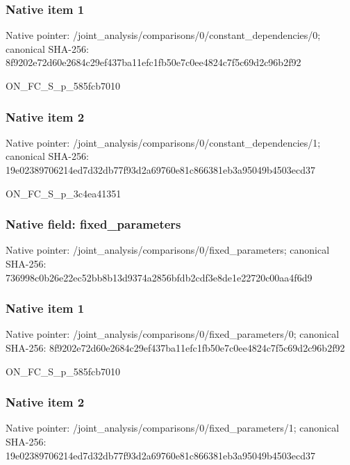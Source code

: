 \documentclass[10pt,a4paper]{article}
\begin{document}
\subsubsection{Native item 1}
Native pointer: /joint\_\allowbreak{}analysis/comparisons/0/constant\_\allowbreak{}dependencies/0; canonical SHA-256: 8f9202e72d60e2684c29ef437ba11efc1fb50e7c0ee4824c7f5c69d2c96b2f92

\begingroup\raggedright\sloppy ON\_\allowbreak{}FC\_\allowbreak{}S\_\allowbreak{}p\_\allowbreak{}585fcb7010\par\endgroup

\subsubsection{Native item 2}
Native pointer: /joint\_\allowbreak{}analysis/comparisons/0/constant\_\allowbreak{}dependencies/1; canonical SHA-256: 19e02389706214ed7d32db77f93d2a69760e81c866381eb3a95049b4503ecd37

\begingroup\raggedright\sloppy ON\_\allowbreak{}FC\_\allowbreak{}S\_\allowbreak{}p\_\allowbreak{}3c4ea41351\par\endgroup

\subsubsection{Native field: fixed\_\allowbreak{}parameters}
Native pointer: /joint\_\allowbreak{}analysis/comparisons/0/fixed\_\allowbreak{}parameters; canonical SHA-256: 736998c0b26e22ec52bb8b13d9374a2856bfdb2cdf3e8de1e22720c00aa4f6d9

\subsubsection{Native item 1}
Native pointer: /joint\_\allowbreak{}analysis/comparisons/0/fixed\_\allowbreak{}parameters/0; canonical SHA-256: 8f9202e72d60e2684c29ef437ba11efc1fb50e7c0ee4824c7f5c69d2c96b2f92

\begingroup\raggedright\sloppy ON\_\allowbreak{}FC\_\allowbreak{}S\_\allowbreak{}p\_\allowbreak{}585fcb7010\par\endgroup

\subsubsection{Native item 2}
Native pointer: /joint\_\allowbreak{}analysis/comparisons/0/fixed\_\allowbreak{}parameters/1; canonical SHA-256: 19e02389706214ed7d32db77f93d2a69760e81c866381eb3a95049b4503ecd37
\end{document}
